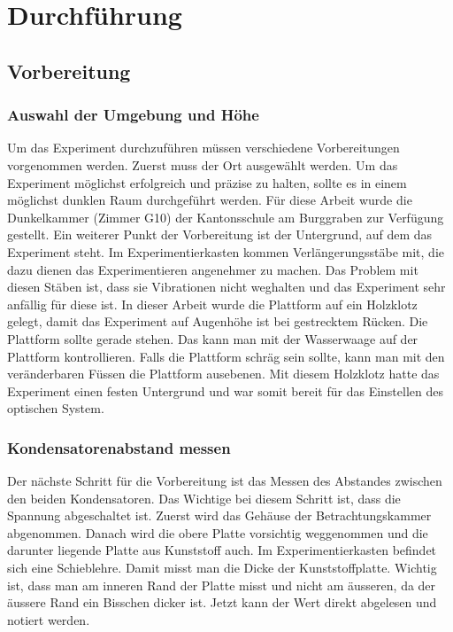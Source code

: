 \chapter{Durchführung}\label{cha:durchfuehrung}
\section{Vorbereitung}\label{sec:vorbereitung}
\subsection{Auswahl der Umgebung und Höhe}\label{sub:auswahlUmgebung}
Um das Experiment durchzuführen müssen verschiedene Vorbereitungen vorgenommen werden. Zuerst muss der Ort ausgewählt werden. Um das Experiment möglichst erfolgreich und präzise zu halten, sollte es in einem möglichst dunklen Raum durchgeführt werden. Für diese Arbeit wurde die Dunkelkammer (Zimmer G10) der Kantonsschule am Burggraben zur Verfügung gestellt. Ein weiterer Punkt der Vorbereitung ist der Untergrund, auf dem das Experiment steht. Im Experimentierkasten kommen Verlängerungsstäbe mit, die dazu dienen das Experimentieren angenehmer zu machen. Das Problem mit diesen Stäben ist, dass sie Vibrationen nicht weghalten und das Experiment sehr anfällig für diese ist. In dieser Arbeit wurde die Plattform auf ein Holzklotz gelegt, damit das Experiment auf Augenhöhe ist bei gestrecktem Rücken. Die Plattform sollte gerade stehen. Das kann man mit der Wasserwaage auf der Plattform kontrollieren. Falls die Plattform schräg sein sollte, kann man mit den veränderbaren Füssen die Plattform ausebenen. Mit diesem Holzklotz hatte das Experiment einen festen Untergrund und war somit bereit für das Einstellen des optischen System. 

\subsection{Kondensatorenabstand messen}\label{sub:kondensatorenabstand}
Der nächste Schritt für die Vorbereitung ist das Messen des Abstandes zwischen den beiden Kondensatoren. Das Wichtige bei diesem Schritt ist, dass die Spannung abgeschaltet ist. Zuerst wird das Gehäuse der Betrachtungskammer abgenommen. Danach wird die obere Platte vorsichtig weggenommen und die darunter liegende Platte aus Kunststoff auch. Im Experimentierkasten befindet sich eine Schieblehre. Damit misst man die Dicke der Kunststoffplatte. Wichtig ist, dass man am inneren Rand der Platte misst und nicht am äusseren, da der äussere Rand ein Bisschen dicker ist. Jetzt kann der Wert direkt abgelesen und notiert werden. 

